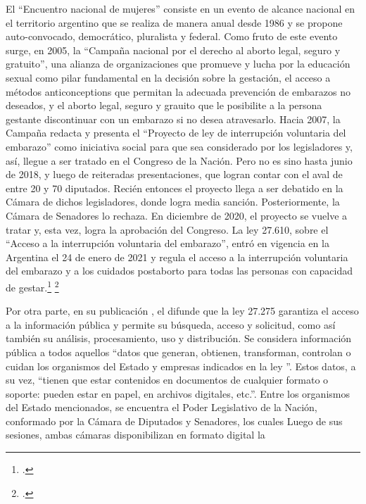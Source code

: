 El ``Encuentro nacional de mujeres'' consiste en un evento de alcance nacional
en el territorio argentino que se realiza de manera anual desde 1986 y se propone
auto-convocado, democr\'atico, pluralista y federal.
Como fruto de este evento surge, en 2005, la ``Campaña nacional por el derecho al
aborto legal, seguro y gratuito'', una alianza de organizaciones que promueve y
lucha por la educaci\'on sexual como pilar fundamental en la decisi\'on sobre la gestaci\'on,
el acceso a m\'etodos anticonceptions que permitan la adecuada prevenci\'on de embarazos
no deseados, y el aborto legal, seguro y grauito que le posibilite a la persona gestante
discontinuar con un embarazo si no desea atravesarlo.
Hacia 2007, la Campaña redacta y presenta el ``Proyecto de ley de interrupci\'on
voluntaria del embarazo'' como iniciativa social para que sea considerado por los
legisladores y, as\'i, llegue a ser tratado en el Congreso de la Naci\'on.
Pero no es sino hasta junio de 2018, y luego de reiteradas presentaciones, que logran
contar con el aval de entre 20 y 70 diputados. Reci\'en entonces el proyecto llega a
ser debatido en la C\'amara de dichos legisladores, donde logra media sanci\'on.
Posteriormente, la C\'amara de Senadores lo rechaza.
En diciembre de 2020, el proyecto se vuelve a tratar y, esta vez, logra la aprobaci\'on
del Congreso.
La ley 27.610, sobre el ``Acceso a la interrupci\'on voluntaria del embarazo'', entr\'o
en vigencia en la Argentina el 24 de enero de 2021 y regula el acceso a la
interrupci\'on voluntaria del embarazo y a los cuidados postaborto para todas
las personas con capacidad de gestar.\footnote{\cite{campana@lalucha}.}
\footnote{\cite{huesped@historia}.}
\par
Por otra parte, en su publicaci\'on ,
el \cite{minjusticia@accesoinfo} difunde que la ley 27.275 garantiza el acceso a la
informaci\'on p\'ublica y permite su b\'usqueda,
acceso y solicitud, como as\'i tambi\'en su an\'alisis, procesamiento, uso y
distribuci\'on.
Se considera informaci\'on p\'ublica a todos aquellos ``datos que generan, obtienen,
transforman, controlan o cuidan los organismos del Estado y empresas indicados en la ley
''. Estos datos, a su vez, ``tienen que estar contenidos en documentos de cualquier
formato o soporte: pueden estar en papel, en archivos digitales, etc.''. Entre los
organismos del Estado mencionados, se encuentra el Poder Legislativo de la
Naci\'on, conformado por la C\'amara de Diputados y Senadores, los cuales
Luego de sus sesiones, ambas c\'amaras disponibilizan en formato digital la
